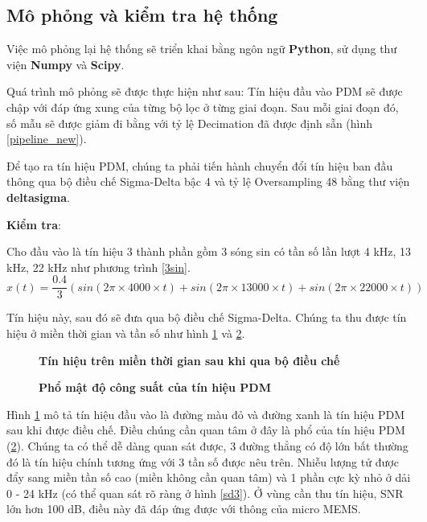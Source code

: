\subsection{Mô phỏng và kiểm tra hệ thống}
Việc mô phỏng lại hệ thống sẽ triển khai bằng ngôn ngữ \textbf{Python}, sử dụng thư viện \textbf{Numpy} và \textbf{Scipy}.

Quá trình mô phỏng sẽ được thực hiện như sau: Tín hiệu đầu vào PDM sẽ được chập với đáp ứng xung của từng bộ lọc ở từng giai đoạn. Sau mỗi giai đoạn đó, số mẫu sẽ được giảm đi bằng với tỷ lệ Decimation đã được định sẵn (hình \ref{pipeline_new}).

Để tạo ra tín hiệu PDM, chúng ta phải tiến hành chuyển đổi tín hiệu ban đầu thông qua bộ điều chế Sigma-Delta bậc 4 và tỷ lệ Oversampling 48 bằng thư viện \textbf{deltasigma}.

\textbf{Kiểm tra}:

Cho đầu vào là tín hiệu 3 thành phần gồm 3 sóng sin có tần số lần lượt 4 kHz, 13 kHz, 22 kHz như phương trình \ref{3sin}.
\begin{equation} \label{3sin}
    x(t) = \frac{0.4}{3} (sin(2\pi \times 4000\times t) + sin(2\pi \times 13000\times t) + sin(2\pi \times 22000\times t))
\end{equation}

Tín hiệu này, sau đó sẽ đưa qua bộ điều chế Sigma-Delta. Chúng ta thu được tín hiệu ở miền thời gian và tần số như hình \ref{sd1} và \ref{sd2}.
\begin{figure}[H]
    \centering
    
    \caption[Tín hiệu trên miền thời gian sau khi qua bộ điều chế]{\bfseries \fontsize{12pt}{0pt}\selectfont Tín hiệu trên miền thời gian sau khi qua bộ điều chế}
    \label{sd1}
\end{figure}

\begin{figure}[H]
    \centering
    
    \caption[Phổ mật độ công suất của tín hiệu PDM]{\bfseries \fontsize{12pt}{0pt}\selectfont Phổ mật độ công suất của tín hiệu PDM}
    \label{sd2}
\end{figure}

Hình \ref{sd1} mô tả tín hiệu đầu vào là đường màu đỏ và đường xanh là tín hiệu PDM sau khi được điều chế. Điều chúng cần quan tâm ở đây là phổ của tín hiệu PDM (\ref{sd2}). Chúng ta có thể dễ dàng quan sát được, 3 đường thẳng có độ lớn bất thường đó là tín hiệu chính tương ứng với 3 tần số được nêu trên. Nhiễu lượng tử được đẩy sang miền tần số cao (miền không cần quan tâm) và 1 phần cực kỳ nhỏ ở dải 0 - 24 kHz (có thể quan sát rõ ràng ở hình \ref{sd3}). Ở vùng cần thu tín hiệu, SNR lớn hơn 100 dB, điều này đã đáp ứng được với thông của micro MEMS.

